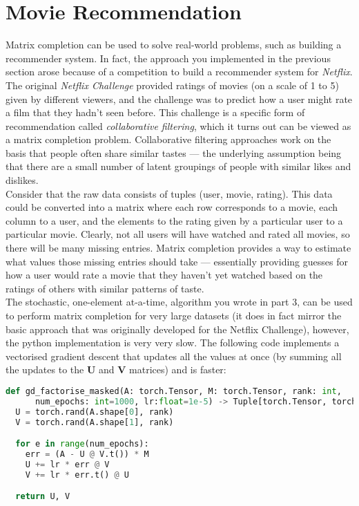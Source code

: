 \documentclass[a4paper]{article}
\begin{document}
\section{Movie Recommendation}
Matrix completion can be used to solve real-world problems, such as building a recommender system. In fact, the approach you implemented in the previous section arose because of a competition to build a recommender system for \emph{Netflix}. The original \emph{Netflix Challenge} provided ratings of movies (on a scale of 1 to 5) given by different viewers, and the challenge was to predict how a user might rate a film that they hadn't seen before. This challenge is a specific form of recommendation called \emph{collaborative filtering}, which it turns out can be viewed as a matrix completion problem. Collaborative filtering approaches work on the basis that people often share similar tastes --- the underlying assumption being that there are a small number of latent groupings of people with similar likes and dislikes.
\\[1em]
Consider that the raw data consists of tuples (user, movie, rating). This data could be converted into a matrix where each row corresponds to a movie, each column to a user, and the elements to the rating given by a particular user to a particular movie. Clearly, not all users will have watched and rated all movies, so there will be many missing entries. Matrix completion provides a way to estimate what values those missing entries should take --- essentially providing guesses for how a user would rate a movie that they haven't yet watched based on the ratings of others with similar patterns of taste.
\\[1em]
The stochastic, one-element at-a-time, algorithm you wrote in part 3, can be used to perform matrix completion for very large datasets (it does in fact mirror the basic approach that was originally developed for the Netflix Challenge), however, the python implementation is very very slow. The following code implements a vectorised gradient descent that updates all the values at once (by summing all the updates to the $\bm U$ and $\bm V$ matrices) and is faster:

\begin{lstlisting}[language=Python]
def gd_factorise_masked(A: torch.Tensor, M: torch.Tensor, rank: int, 
      num_epochs: int=1000, lr:float=1e-5) -> Tuple[torch.Tensor, torch.Tensor]:
  U = torch.rand(A.shape[0], rank)
  V = torch.rand(A.shape[1], rank)

  for e in range(num_epochs):
    err = (A - U @ V.t()) * M
    U += lr * err @ V
    V += lr * err.t() @ U

  return U, V
\end{lstlisting}
\end{document}
